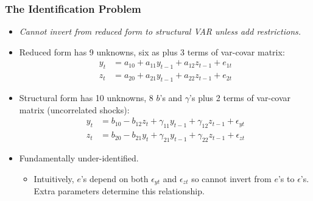 \documentclass[english,xcolor=svgnames]{beamer}
\begin{document}
\begin{frame}
\frametitle{The Identification Problem
}
\begin{itemize}
	\item \emph{Cannot invert from reduced form to structural VAR unless add restrictions.}
	\item Reduced form has 9 unknowns, six as plus 3 terms of var-covar matrix:
	\begin{align*}
		y_t &= a_{10} + a_{11}y_{t-1}+a_{12}z_{t-1}+e_{1t} \\
		z_t &= a_{20} + a_{21}y_{t-1}+a_{22}z_{t-1}+e_{2t}
	\end{align*}
	\item Structural form has 10 unknowns, 8 $b$'s and $\gamma$'s plus 2 terms of
var-covar matrix (uncorrelated shocks):
	\begin{align*}
		y_t &= b_{10}-b_{12}z_t + \gamma_{11}y_{t-1}+\gamma_{12}z_{t-1}+\epsilon_{yt} \\
		z_t &= b_{20}-b_{21}y_t + \gamma_{21}y_{t-1}+\gamma_{22}z_{t-1}+\epsilon_{zt}
	\end{align*}
	\item Fundamentally under-identified.
	\begin{itemize}
		\item Intuitively, $e$'s depend on both $\epsilon_{yt}$ and $\epsilon_{zt}$ so cannot invert from $e$'s to $\epsilon$'s. Extra parameters determine this relationship.
	\end{itemize}
\end{itemize}
\end{frame}
\end{document}
